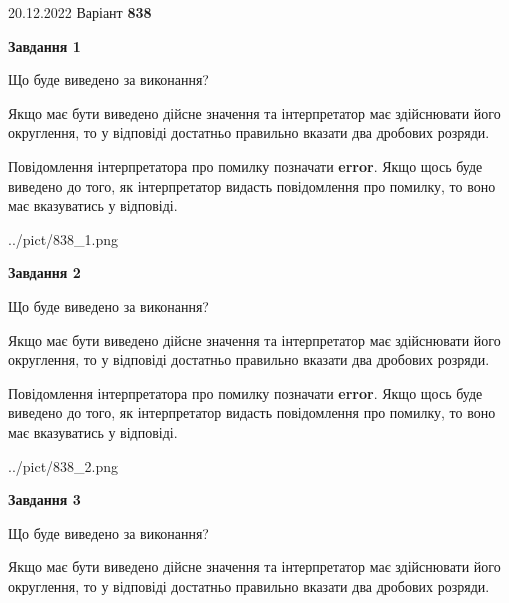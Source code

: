 \documentclass[12pt, ukrainian]{article}
\begin{document}
{20.12.2022 Варіант \No \textbf { 838 }\par}
{
\begin {Large}

{\begin {center}\textbf{Завдання 1}\end {center}}\par
Що буде виведено за виконання? \par

Якщо має бути виведено дійсне значення та інтерпретатор має здійснювати його округлення, 
то у відповіді достатньо правильно вказати два дробових розряди.

Повідомлення інтерпретатора про помилку позначати \textbf{error}.
Якщо щось буде виведено до того, як інтерпретатор видасть повідомлення про помилку, 
то воно має вказуватись у відповіді. \par

\begin{center}
	{../pict/838_1.png}
\end{center}
\newpage

{\begin {center}\textbf{Завдання 2}\end {center}}\par
Що буде виведено за виконання? \par

Якщо має бути виведено дійсне значення та інтерпретатор має здійснювати його округлення, 
то у відповіді достатньо правильно вказати два дробових розряди.

Повідомлення інтерпретатора про помилку позначати \textbf{error}.
Якщо щось буде виведено до того, як інтерпретатор видасть повідомлення про помилку, 
то воно має вказуватись у відповіді. \par

\begin{center}
	{../pict/838_2.png}
\end{center}
\newpage

{\begin {center}\textbf{Завдання 3}\end {center}}\par
Що буде виведено за виконання? \par

Якщо має бути виведено дійсне значення та інтерпретатор має здійснювати його округлення, 
то у відповіді достатньо правильно вказати два дробових розряди.


\end{Large}}
\end{document}
